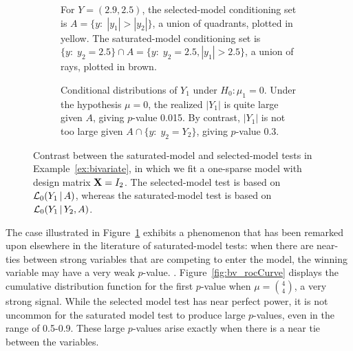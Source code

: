 \documentclass{article}
\begin{document}
\begin{figure}
  \centering
  \begin{subfigure}[t]{.4\textwidth}
    \caption{ 
      For $Y=(2.9,2.5)$, the selected-model conditioning set is
      $A=\{y:\;|y_1|>|y_2|\}$, a union of quadrants,
      plotted in yellow. The saturated-model conditioning set
      is ${\{y:\; y_2=2.5\}\cap A} = {\{y:\;y_2=2.5, |y_1|>2.5\}}$,
      a union of rays, plotted in brown.}
    \label{fig:bv_condSets}
  \end{subfigure}
  \hspace{.1\textwidth}
  \begin{subfigure}[t]{.4\textwidth}
    \caption{ 
      Conditional distributions of $Y_1$ under
      $H_0:\mu_1 = 0$. Under the hypothesis
      $\mu=0$, the realized  $|Y_1|$ is  quite large given $A$,
      giving  $p$-value 0.015. By contrast, $|Y_1|$ is not too large
      given $A \cap \{y:\; y_2=Y_2\}$, giving
      $p$-value 0.3.}
  \end{subfigure}
  \caption{ 
    Contrast between the saturated-model and selected-model tests
    in Example~\ref{ex:bivariate}, in which we fit a one-sparse model with
    design matrix $\mathbf{X}=I_2$. The selected-model test is based
    on  $\mathcal{L}_0(Y_1 \,|\, A)$, whereas the saturated-model test is based
    on $\mathcal{L}_0(Y_1  \,|\,  Y_2, A)$.}
  \label{fig:bv_nullDists}
\end{figure}


The case illustrated in Figure~\ref{fig:bv_condSets} exhibits a phenomenon that has been remarked upon elsewhere in the literature of saturated-model tests: when there are near-ties between strong variables that are competing to enter the model, the winning variable may have a very weak $p$-value. . Figure~\ref{fig:bv_rocCurve} displays the cumulative distribution function for the first $p$-value when $\mu=\binom{4}{4}$, a very strong signal. While the selected model test has near perfect power, it is not uncommon for the saturated model test to produce large $p$-values, even in the range of 0.5-0.9. These large $p$-values arise exactly when there is a near tie between the variables.
\end{document}
